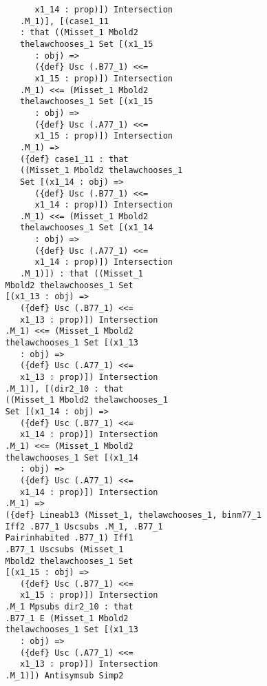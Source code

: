 \documentclass[12pt]{article}
\begin{document}
\begin{verbatim}
                      x1_14 : prop)]) Intersection 
                   .M_1)], [(case1_11 
                   : that ((Misset_1 Mbold2 
                   thelawchooses_1 Set [(x1_15 
                      : obj) => 
                      ({def} Usc (.B77_1) <<= 
                      x1_15 : prop)]) Intersection 
                   .M_1) <<= (Misset_1 Mbold2 
                   thelawchooses_1 Set [(x1_15 
                      : obj) => 
                      ({def} Usc (.A77_1) <<= 
                      x1_15 : prop)]) Intersection 
                   .M_1) => 
                   ({def} case1_11 : that 
                   ((Misset_1 Mbold2 thelawchooses_1 
                   Set [(x1_14 : obj) => 
                      ({def} Usc (.B77_1) <<= 
                      x1_14 : prop)]) Intersection 
                   .M_1) <<= (Misset_1 Mbold2 
                   thelawchooses_1 Set [(x1_14 
                      : obj) => 
                      ({def} Usc (.A77_1) <<= 
                      x1_14 : prop)]) Intersection 
                   .M_1)]) : that ((Misset_1 
                Mbold2 thelawchooses_1 Set 
                [(x1_13 : obj) => 
                   ({def} Usc (.B77_1) <<= 
                   x1_13 : prop)]) Intersection 
                .M_1) <<= (Misset_1 Mbold2 
                thelawchooses_1 Set [(x1_13 
                   : obj) => 
                   ({def} Usc (.A77_1) <<= 
                   x1_13 : prop)]) Intersection 
                .M_1)], [(dir2_10 : that 
                ((Misset_1 Mbold2 thelawchooses_1 
                Set [(x1_14 : obj) => 
                   ({def} Usc (.B77_1) <<= 
                   x1_14 : prop)]) Intersection 
                .M_1) <<= (Misset_1 Mbold2 
                thelawchooses_1 Set [(x1_14 
                   : obj) => 
                   ({def} Usc (.A77_1) <<= 
                   x1_14 : prop)]) Intersection 
                .M_1) => 
                ({def} Lineab13 (Misset_1, thelawchooses_1, binm77_1 
                Iff2 .B77_1 Uscsubs .M_1, .B77_1 
                Pairinhabited .B77_1) Iff1 
                .B77_1 Uscsubs (Misset_1 
                Mbold2 thelawchooses_1 Set 
                [(x1_15 : obj) => 
                   ({def} Usc (.B77_1) <<= 
                   x1_15 : prop)]) Intersection 
                .M_1 Mpsubs dir2_10 : that 
                .B77_1 E (Misset_1 Mbold2 
                thelawchooses_1 Set [(x1_13 
                   : obj) => 
                   ({def} Usc (.A77_1) <<= 
                   x1_13 : prop)]) Intersection 
                .M_1)]) Antisymsub Simp2 

\end{verbatim}
\end{document}
